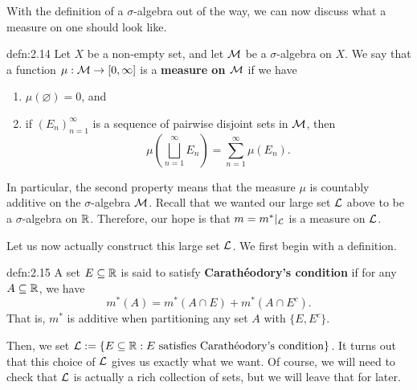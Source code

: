 With the definition of a $\sigma$-algebra out of the way, we can now
discuss what a measure on one should look like. 

\begin{defn}{defn:2.14}
    Let $X$ be a non-empty set, and let ${\cal M}$ be a $\sigma$-algebra on $X$. 
    We say that a function $\mu : {\cal M} \to [0, \infty]$ is a 
    {\bf measure on ${\cal M}$} if we have 
    \begin{enumerate}[(1)]
        \item $\mu(\varnothing) = 0$, and 
        \item if $(E_n)_{n=1}^\infty$ is a sequence of pairwise disjoint sets
        in ${\cal M}$, then 
        \[ \mu\!\left( \bigsqcup_{n=1}^\infty E_n \right) = \sum_{n=1}^\infty 
        \mu(E_n). \] 
    \end{enumerate}
\end{defn}

In particular, the second property means that the measure $\mu$ is 
countably additive on the $\sigma$-algebra ${\cal M}$. Recall that we wanted 
our large set ${\cal L}$ above to be a $\sigma$-algebra on $\mathbb{R}$. Therefore, 
our hope is that $m = m^*|_{\cal L}$ is a measure on ${\cal L}$.

Let us now actually construct this large set ${\cal L}$. We first begin 
with a definition. 

\begin{defn}{defn:2.15}
    A set $E \subseteq \mathbb{R}$ is said to satisfy {\bf Carathéodory's condition} 
    if for any $A \subseteq \mathbb{R}$, we have 
    \[ m^*(A) = m^*(A \cap E) + m^*(A \cap E^c). \] 
    That is, $m^*$ is additive when partitioning any set $A$ with 
    $\{E, E^c\}$. 
\end{defn}

Then, we set ${\cal L} := \{E \subseteq \mathbb{R} : E \text { satisfies 
Carathéodory's condition}\}$. It turns out that this choice of ${\cal L}$ 
gives us exactly what we want. Of course, we will need to check that 
${\cal L}$ is actually a rich collection of sets, but we will leave 
that for later. 

